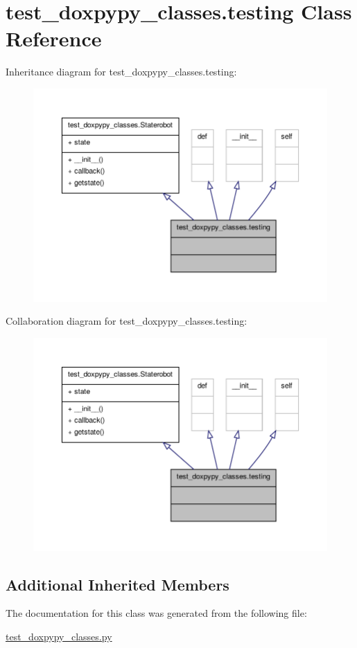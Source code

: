 \hypertarget{classtest__doxpypy__classes_1_1testing}{\section{test\+\_\+doxpypy\+\_\+classes.\+testing Class Reference}
\label{classtest__doxpypy__classes_1_1testing}
}


Inheritance diagram for test\+\_\+doxpypy\+\_\+classes.\+testing\+:
\nopagebreak
\begin{figure}[H]
\begin{center}
\leavevmode
\includegraphics[width=350pt]{classtest__doxpypy__classes_1_1testing__inherit__graph}
\end{center}
\end{figure}


Collaboration diagram for test\+\_\+doxpypy\+\_\+classes.\+testing\+:
\nopagebreak
\begin{figure}[H]
\begin{center}
\leavevmode
\includegraphics[width=350pt]{classtest__doxpypy__classes_1_1testing__coll__graph}
\end{center}
\end{figure}
\subsection*{Additional Inherited Members}


The documentation for this class was generated from the following file\+:\begin{DoxyCompactItemize}
\item 
\hyperlink{test__doxpypy__classes_8py}{test\+\_\+doxpypy\+\_\+classes.\+py}\end{DoxyCompactItemize}
